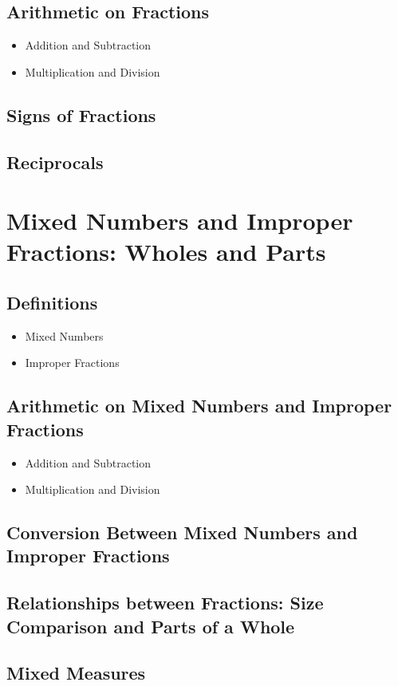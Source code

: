 \documentclass[11pt]{article}
\begin{document}
\subsection{Arithmetic on Fractions}
\begin{itemize}
    \item Addition and Subtraction
    \item Multiplication and Division
\end{itemize}
\subsection{Signs of Fractions}
\subsection{Reciprocals}

\section{Mixed Numbers and Improper Fractions: Wholes and Parts}
\subsection{Definitions}
\begin{itemize}
    \item Mixed Numbers
    \item Improper Fractions
\end{itemize}
\subsection{Arithmetic on Mixed Numbers and Improper Fractions}
\begin{itemize}
    \item Addition and Subtraction
    \item Multiplication and Division
\end{itemize}
\subsection{Conversion Between Mixed Numbers and Improper Fractions}
\subsection{Relationships between Fractions: Size Comparison and Parts of a Whole}
\subsection{Mixed Measures}
\end{document}
